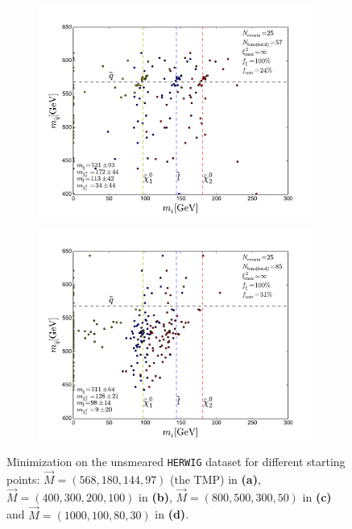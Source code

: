 \documentclass[twoside,english]{uiofysmaster}
\begin{document}
\begin{figure}[hbt]
	\begin{subfigure}[b]{0.45\textwidth}
		\includegraphics[width=\textwidth]{figures/webber_rec_table/webber-rec_wrong_starting_point-800-500-300-50_lowtol.pdf} 
		\caption{ }
	\end{subfigure}
	\begin{subfigure}[b]{0.45\textwidth}
		\includegraphics[width=\textwidth]{figures/webber_rec_table/webber-rec_wrong_starting_point-1000-100-80-30_lowtol.pdf}
		\caption{ } 
	\end{subfigure}
	\caption{Minimization on the unsmeared {\tt HERWIG} dataset for different starting points: $\vec M = (568, 180, 144, 97)$ (the TMP) in {\bf (a)}, $\vec M = (400, 300, 200, 100)$  in {\bf (b)}, $\vec M = (800, 500, 300, 50)$ in {\bf (c)} and $\vec M = (1000, 100, 80, 30)$ in {\bf (d)}.}
	\label{fig:starting_point_sensitivity_combinatorics}
\end{figure}
\end{document}
